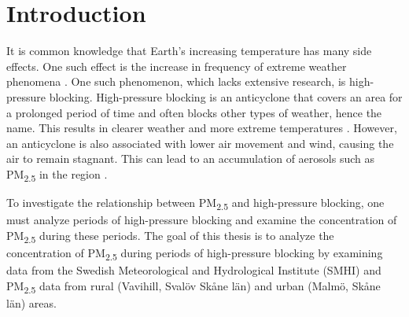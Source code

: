 \section{Introduction}
It is common knowledge that Earth's increasing temperature has many side effects. One such effect is the increase in frequency of extreme weather phenomena \cite{mitchellExtremeEventsDue2006}. One such phenomenon, which lacks extensive research, is high-pressure blocking. High-pressure blocking is an anticyclone that covers an area for a prolonged period of time and often blocks other types of weather, hence the name. This results in clearer weather and more extreme temperatures \cite{lupoAtmosphericBlockingEvents2020}. However, an anticyclone is also associated with lower air movement and wind, causing the air to remain stagnant. This can lead to an accumulation of aerosols such as PM\textsubscript{2.5} in the region \cite{caiImpactBlockingStructure2020}.

To investigate the relationship between PM\textsubscript{2.5} and high-pressure blocking, one must analyze periods of high-pressure blocking and examine the concentration of PM\textsubscript{2.5} during these periods. The goal of this thesis is to analyze the concentration of PM\textsubscript{2.5} during periods of high-pressure blocking by examining data from the Swedish Meteorological and Hydrological Institute (SMHI) and PM\textsubscript{2.5} data from rural (Vavihill, Svalöv Skåne län) and urban (Malmö, Skåne län) areas.
